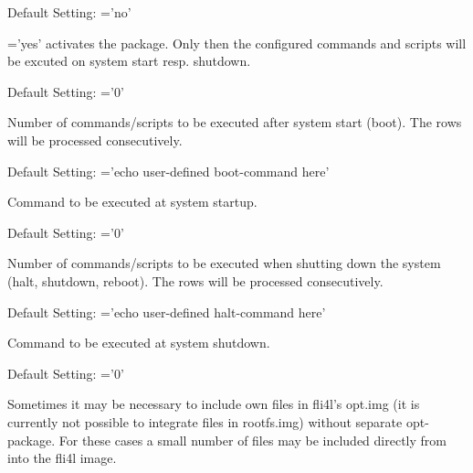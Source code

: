 \begin{description}


        Default Setting: ='no'

    ='yes' activates the package. Only then the configured
    commands and scripts will be excuted on system start resp. shutdown.



        Default Setting: ='0'

    Number of commands/scripts to be executed after system start (boot).
    The rows will be processed consecutively.


        Default Setting: ='echo user-defined boot-command here'

    Command to be executed at system startup.




        Default Setting: ='0'

    Number of commands/scripts to be executed when shutting down the system (halt, shutdown, reboot).
    The rows will be processed consecutively.


        Default Setting: ='echo user-defined halt-command here'

    Command to be executed at system shutdown.



        Default Setting: ='0'

   Sometimes it may be necessary to include own files in fli4l's
   opt.img (it is currently not possible to integrate files in rootfs.img)
   without separate opt-package. For these cases a small number of files
   may be included directly from 
   into the fli4l image.


\end{description}
